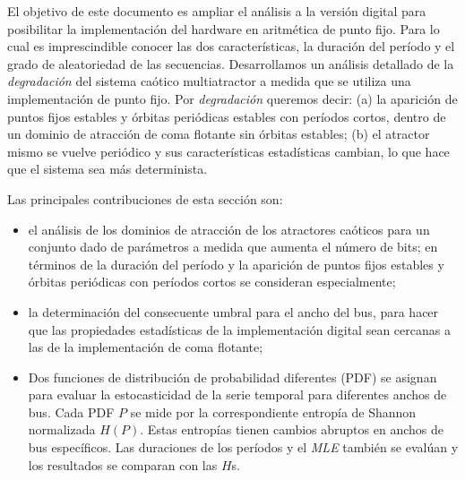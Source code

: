El objetivo de este documento es ampliar el análisis a la versión digital para posibilitar la implementación del hardware en aritmética de punto fijo.
Para lo cual es imprescindible conocer las dos características, la duración del período y el grado de aleatoriedad de las secuencias.
Desarrollamos un análisis detallado de la \textsl{degradación} del sistema caótico multiatractor a medida que se utiliza una implementación de punto fijo.
Por \textsl{degradación} queremos decir:
(a) la aparición de puntos fijos estables y órbitas periódicas estables con períodos cortos, dentro de un dominio de atracción de coma flotante sin órbitas estables;
(b) el atractor mismo se vuelve periódico y sus características estadísticas cambian, lo que hace que el sistema sea más determinista.

Las principales contribuciones de esta sección son:
\begin{itemize}
\item el análisis de los dominios de atracción de los atractores caóticos para un conjunto dado de parámetros a medida que aumenta el número de bits; en términos de la duración del período y la aparición de puntos fijos estables y órbitas periódicas con períodos cortos se consideran especialmente;
\item la determinación del consecuente umbral para el ancho del bus, para hacer que las propiedades estadísticas de la implementación digital sean cercanas a las de la implementación de coma flotante;
\item Dos funciones de distribución de probabilidad diferentes (PDF) se asignan para evaluar la estocasticidad de la serie temporal para diferentes anchos de bus.
Cada PDF $P$ se mide por la correspondiente entropía de Shannon normalizada $H(P)$.
Estas entropías tienen cambios abruptos en anchos de bus específicos.
Las duraciones de los períodos y el \textsl{MLE} también se evalúan y los resultados se comparan con las $H$s.
\end{itemize}
